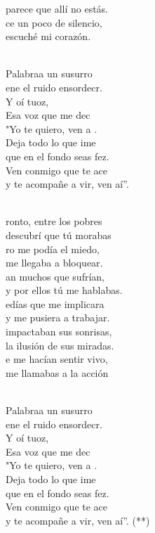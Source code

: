 \begin{cancion}
parece que allí no estás.\\
	ce un poco de silencio, \\
escuché mi corazón.\\\jump\\
	\begin{chorus}%
	 Palabraa un susurro \\
	ene el ruido ensordecr.\\
	Y oí tuoz,\\
	Esa voz que me dec \\
	"Yo te quiero, ven a . \\
	Deja todo lo que ime \\
	que en el fondo seas fez.\\
	Ven conmigo que te ace \\
	y te acompañe a vir, ven aí”.\\
	\end{chorus}%
	\jump\\
	ronto, entre los pobres \\
descubrí que tú morabas\\
	ro me podía el miedo, \\
me llegaba a bloquear.\\
	an muchos que sufrían, \\
y por ellos tú me hablabas.\\
	edías que me implicara \\
y me pusiera a trabajar.\\
	 impactaban sus sonrisas, \\
la ilusión de sus miradas.\\
	e me hacían sentir vivo, \\
me llamabas a la acción\\\jump\\
	\begin{chorus}%
	 Palabraa un susurro \\
	ene el ruido ensordecr.\\
	Y oí tuoz,\\
	Esa voz que me dec \\
	"Yo te quiero, ven a . \\
	Deja todo lo que ime \\
	que en el fondo seas fez.\\
	Ven conmigo que te ace \\
	y te acompañe a vir, ven aí”. (**)\\
	\end{chorus}%
	\jump\\
\end{cancion}%
